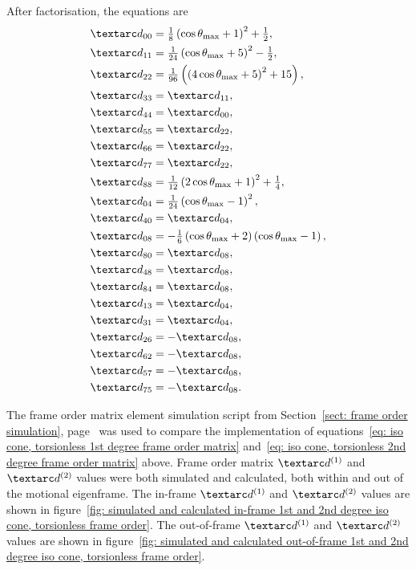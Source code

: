 After factorisation, the equations are
\begin{subequations} \label{eq: iso cone, torsionless 2nd degree frame order matrix}
\begin{align}
    &\FO_{00} = \tfrac{1}{8} \left( \cos\conethetamax + 1 \right)^2 + \half, \\
    &\FO_{11} = \tfrac{1}{24} \left( \cos\conethetamax + 5 \right)^2 - \half, \\
    &\FO_{22} = \tfrac{1}{96} \left( \left( 4\cos\conethetamax + 5 \right)^2 + 15 \right) , \\
    &\FO_{33} = \FO_{11} , \\
    &\FO_{44} = \FO_{00} , \\
    &\FO_{55} = \FO_{22} , \\
    &\FO_{66} = \FO_{22} , \\
    &\FO_{77} = \FO_{22} , \\
    &\FO_{88} = \tfrac{1}{12} \left( 2\cos\conethetamax + 1 \right)^2 + \quart, \\
    &\FO_{04} = \tfrac{1}{24} \left( \cos\conethetamax - 1 \right)^2 , \\
    &\FO_{40} = \FO_{04} , \\
    &\FO_{08} = -\tfrac{1}{6} \left( \cos\conethetamax + 2 \right) \left( \cos\conethetamax - 1 \right) , \\
    &\FO_{80} = \FO_{08} , \\
    &\FO_{48} = \FO_{08} , \\
    &\FO_{84} = \FO_{08} , \\
    &\FO_{13} = \FO_{04} , \\
    &\FO_{31} = \FO_{04} , \\
    &\FO_{26} = -\FO_{08} , \\
    &\FO_{62} = -\FO_{08} , \\
    &\FO_{57} = -\FO_{08} , \\
    &\FO_{75} = -\FO_{08} .
\end{align}
\end{subequations}


The frame order matrix element simulation script from Section~\ref{sect: frame order simulation}, page~\pageref{sect: frame order simulation} was used to compare the implementation of equations~\ref{eq: iso cone, torsionless 1st degree frame order matrix} and~\ref{eq: iso cone, torsionless 2nd degree frame order matrix} above.
Frame order matrix $\FOone$ and $\FOtwo$ values were both simulated and calculated, both within and out of the motional eigenframe.
The in-frame $\FOone$ and $\FOtwo$ values are shown in figure~\ref{fig: simulated and calculated in-frame 1st and 2nd degree iso cone, torsionless frame order}.
The out-of-frame $\FOone$ and $\FOtwo$ values are shown in figure~\ref{fig: simulated and calculated out-of-frame 1st and 2nd degree iso cone, torsionless frame order}.



